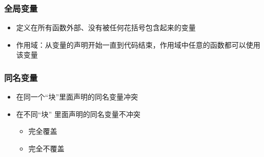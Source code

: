 

\begin{frame}[fragile]
    \frametitle{全局变量}

        \begin{itemize}
            \item 定义在所有函数外部、没有被任何花括号包含起来的变量
            \item 作用域：从变量的声明开始一直到代码结束，作用域中任意的函数都可以使用该变量
        \end{itemize}
    
\end{frame}



\begin{frame}[fragile]
    \frametitle{同名变量}

        \begin{itemize}
            \item 在同一个“块”里面声明的同名变量冲突
            \item 在不同“块” 里面声明的同名变量不冲突

            \begin{itemize}
                \item 完全覆盖
                \item 完全不覆盖
            \end{itemize}
            
        \end{itemize}
    
\end{frame}



